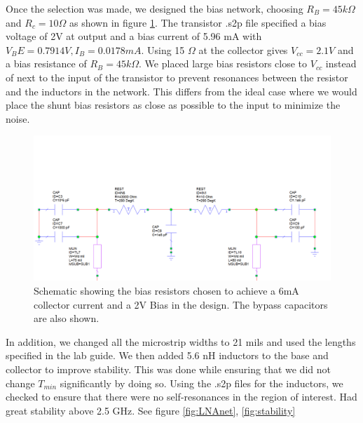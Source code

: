 \documentclass[twocolumn, aps, floatfix]{revtex4-1}
\begin{document}
Once the selection was made, we designed the bias network, choosing $R_B = 45 k \Omega$ and $R_c = 10 \Omega$ as shown in figure \ref{fig:dcnet}. The transistor .s2p file specified a bias voltage of 2V at output and a bias current of 5.96 mA with $V_BE = 0.7914 V, I_B = 0.0178 mA$. Using 15 $\Omega$ at the collector gives $V_{cc} = 2.1 V$ and a bias resistance of $R_B = 45 k \Omega$. We placed large bias resistors close to $V_{cc}$ instead of next to the input of the transistor to prevent resonances between the resistor and the inductors in the network. This differs from the ideal case where we would place the shunt bias resistors as close as possible to the input to minimize the noise.

    \begin{figure}[!htbp]
        \centering
        \includegraphics[scale=0.35]{dc_net.png}
        \caption{Schematic showing the bias resistors chosen to achieve a 6mA collector current and a 2V Bias in the design. The bypass capacitors are also shown.}
        \label{fig:dcnet}
    \end{figure}

In addition, we changed all the microstrip widths to 21 mils and used the lengths specified in the lab guide. We then added 5.6 nH inductors to the base and collector to improve stability. This was done while ensuring that we did not change $T_{min}$ significantly by doing so. Using the .s2p files for the inductors, we checked to ensure that there were no self-resonances in the region of interest. Had great stability above 2.5 GHz. See figure \ref{fig:LNAnet}, \ref{fig:stability}
\end{document}
